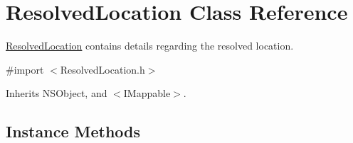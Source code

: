 \hypertarget{interface_resolved_location}{}\section{Resolved\+Location Class Reference}
\label{interface_resolved_location}


\hyperlink{interface_resolved_location}{Resolved\+Location} contains details regarding the resolved location.  




{\ttfamily \#import $<$Resolved\+Location.\+h$>$}



Inherits N\+S\+Object, and $<$\+I\+Mappable$>$.

\subsection*{Instance Methods}
